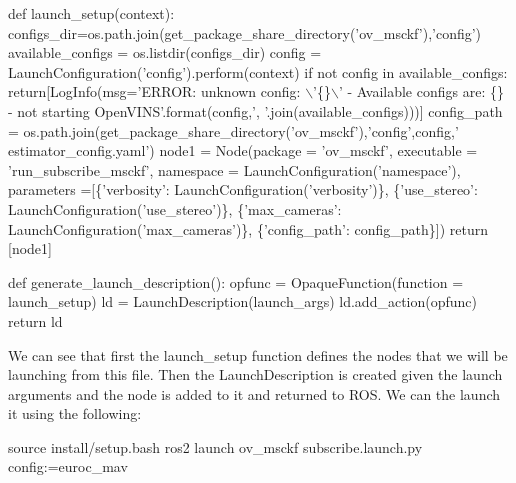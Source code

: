 \begin{DoxyCode}
\textcolor{keyword}{def }launch\_setup(context):
    configs\_dir=os.path.join(get\_package\_share\_directory(\textcolor{stringliteral}{'ov\_msckf'}),\textcolor{stringliteral}{'config'})
    available\_configs = os.listdir(configs\_dir)
    config = LaunchConfiguration(\textcolor{stringliteral}{'config'}).perform(context)
    \textcolor{keywordflow}{if} \textcolor{keywordflow}{not} config \textcolor{keywordflow}{in} available\_configs:
        \textcolor{keywordflow}{return}[LogInfo(msg=\textcolor{stringliteral}{'ERROR: unknown config: \(\backslash\)'\{\}\(\backslash\)' - Available configs are: \{\} - not starting
       OpenVINS'}.format(config,\textcolor{stringliteral}{', '}.join(available\_configs)))]
    config\_path = os.path.join(get\_package\_share\_directory(\textcolor{stringliteral}{'ov\_msckf'}),\textcolor{stringliteral}{'config'},config,\textcolor{stringliteral}{'
      estimator\_config.yaml'})
    node1 = Node(package = \textcolor{stringliteral}{'ov\_msckf'},
                 executable = \textcolor{stringliteral}{'run\_subscribe\_msckf'},
                 namespace = LaunchConfiguration(\textcolor{stringliteral}{'namespace'}),
                 parameters =[\{\textcolor{stringliteral}{'verbosity'}: LaunchConfiguration(\textcolor{stringliteral}{'verbosity'})\},
                              \{\textcolor{stringliteral}{'use\_stereo'}: LaunchConfiguration(\textcolor{stringliteral}{'use\_stereo'})\},
                              \{\textcolor{stringliteral}{'max\_cameras'}: LaunchConfiguration(\textcolor{stringliteral}{'max\_cameras'})\},
                              \{\textcolor{stringliteral}{'config\_path'}: config\_path\}])
    \textcolor{keywordflow}{return} [node1]

\textcolor{keyword}{def }generate\_launch\_description():
    opfunc = OpaqueFunction(function = launch\_setup)
    ld = LaunchDescription(launch\_args)
    ld.add\_action(opfunc)
    \textcolor{keywordflow}{return} ld
\end{DoxyCode}
 

We can see that first the {\ttfamily launch\+\_\+setup} function defines the nodes that we will be launching from this file. Then the {\ttfamily Launch\+Description} is created given the launch arguments and the node is added to it and returned to R\+OS. We can the launch it using the following\+:


\begin{DoxyCode}
source install/setup.bash
ros2 launch ov\_msckf subscribe.launch.py config:=euroc\_mav
\end{DoxyCode}


